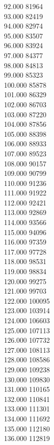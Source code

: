 { 92.000	81964 \\
 93.000	82419 \\
 94.000	82974 \\
 95.000	83507 \\
 96.000	83924 \\
 97.000	84377 \\
 98.000	84813 \\
 99.000	85323 \\
 100.000	85878 \\
 101.000	86329 \\
 102.000	86703 \\
 103.000	87220 \\
 104.000	87856 \\
 105.000	88398 \\
 106.000	88933 \\
 107.000	89523 \\
 108.000	90157 \\
 109.000	90799 \\
 110.000	91236 \\
 111.000	91922 \\
 112.000	92421 \\
 113.000	92869 \\
 114.000	93566 \\
 115.000	94096 \\
 116.000	97359 \\
 117.000	97728 \\
 118.000	98531 \\
 119.000	98834 \\
 120.000	99275 \\
 121.000	99703 \\
 122.000	100095 \\
 123.000	103914 \\
 124.000	106603 \\
 125.000	107113 \\
 126.000	107732 \\
 127.000	108113 \\
 128.000	108586 \\
 129.000	109238 \\
 130.000	109830 \\
 131.000	110165 \\
 132.000	110841 \\
 133.000	111301 \\
 134.000	111692 \\
 135.000	112180 \\
 136.000	112819 \\
}
